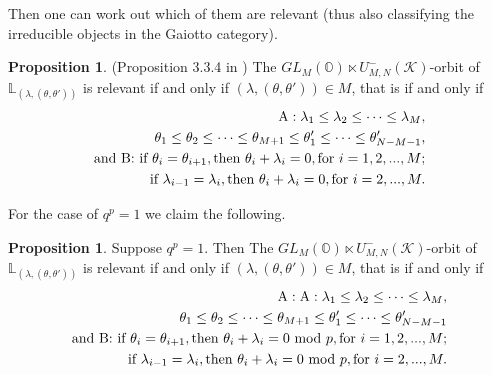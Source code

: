 \documentclass[12pt]{amsart}
\numberwithin{equation}{section}
\numberwithin{equation}{section}
\theoremstyle{definition}
\newtheorem{proposition}[theorem]{Proposition}
\begin{document}
Then one can work out which of them are relevant (thus also classifying the irreducible objects in the Gaiotto category). 

\begin{proposition}\label{Proposition_ty}(Proposition 3.3.4 in \cite{ty})
    The  $GL_M(\mathbb{O})\ltimes U_{M,N}^-(\mathcal{K})$-orbit of $\mathbb{L}_{(\lambda,(\theta, \theta'))}$ is relevant if and only if $(\lambda,(\theta, \theta')) \in M$, that is if and only if
\begin{equation}\label{condition 3.4}
  \begin{split}
    \textnormal{A}:    \lambda_1\leq\lambda_2\leq\cdots\leq \lambda_M,\\
        \theta_{1}\leq \theta_2\leq\cdots\leq\theta_{M+1}\leq\theta'_1\leq\cdots \leq \theta'_{N-M-1},\\
        \textnormal{and B: if }  \theta_i=\theta_{i+1}, \textnormal{then } \theta_i+\lambda_i=0 , \textnormal{for } i=1,2,..., M;\\
        \textnormal{if } \lambda_{i-1}=\lambda_i, \textnormal{then } \theta_i+\lambda_i=0 , \textnormal{for } i=2,..., M.
    \end{split}
\end{equation}
\end{proposition}
For the case of $q^p=1$ we claim the following.
\begin{proposition}
\label{Proposition_ty_root} Suppose $q^p=1$. Then 
    The  $GL_M(\mathbb{O})\ltimes U_{M,N}^-(\mathcal{K})$-orbit of $\mathbb{L}_{(\lambda,(\theta, \theta'))}$ is relevant if and only if $(\lambda,(\theta, \theta')) \in M$, that is if and only if
\begin{equation}\label{condition 3.4}
  \begin{split}
    \textnormal{A}:    \textnormal{A}:    \lambda_1\leq\lambda_2\leq\cdots\leq \lambda_M,\\
        \theta_{1}\leq \theta_2\leq\cdots\leq\theta_{M+1}\leq\theta'_1\leq\cdots \leq \theta'_{N-M-1}\\
        \textnormal{and B: if }  \theta_i=\theta_{i+1}, \textnormal{then } \theta_i+\lambda_i=0 \text{ mod }p, \textnormal{for } i=1,2,..., M;\\
        \textnormal{if } \lambda_{i-1}=\lambda_i, \textnormal{then } \theta_i+\lambda_i=0 \text{ mod }p, \textnormal{for } i=2,..., M.
    \end{split}
\end{equation}
\end{proposition}
\end{document}

